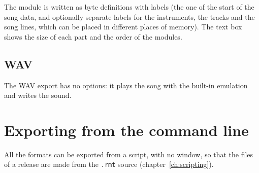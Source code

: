 
The module is written as byte definitions with labels (the one of the start of the song data, and optionally separate labels for the
instruments, the tracks and the song lines, which can be placed in different places of memory). The text box shows the size of each
part and the order of the modules.

\subsection{WAV}

The WAV export has no options: it plays the song with the built-in emulation and writes the sound.

\section{Exporting from the command line}

All the formats can be exported from a script, with no window, so that the files of a release are made from the \texttt{.rmt}
source (chapter~\ref{ch:scripting}).
